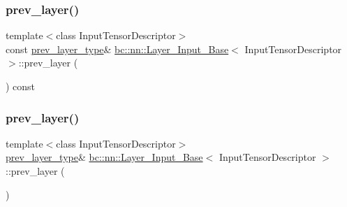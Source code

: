 \mbox{\label{classbc_1_1nn_1_1Layer__Input__Base_a30fe05002f852c298572f41da7486670}} 
\subsubsection{\texorpdfstring{prev\+\_\+layer()}{prev\_layer()}\hspace{0.1cm}{\footnotesize\ttfamily [3/4]}}
{\footnotesize\ttfamily template$<$class Input\+Tensor\+Descriptor$>$ \\
const \hyperlink{structbc_1_1nn_1_1Layer__Output__Base}{prev\+\_\+layer\+\_\+type}\& \hyperlink{classbc_1_1nn_1_1Layer__Input__Base}{bc\+::nn\+::\+Layer\+\_\+\+Input\+\_\+\+Base}$<$ Input\+Tensor\+Descriptor $>$\+::prev\+\_\+layer (\begin{DoxyParamCaption}{ }\end{DoxyParamCaption}) const\hspace{0.3cm}{\ttfamily [inline]}}

\mbox{\label{classbc_1_1nn_1_1Layer__Input__Base_aa46a9668548a06e6538f485a0200edbc}} 
\subsubsection{\texorpdfstring{prev\+\_\+layer()}{prev\_layer()}\hspace{0.1cm}{\footnotesize\ttfamily [4/4]}}
{\footnotesize\ttfamily template$<$class Input\+Tensor\+Descriptor$>$ \\
\hyperlink{structbc_1_1nn_1_1Layer__Output__Base}{prev\+\_\+layer\+\_\+type}\& \hyperlink{classbc_1_1nn_1_1Layer__Input__Base}{bc\+::nn\+::\+Layer\+\_\+\+Input\+\_\+\+Base}$<$ Input\+Tensor\+Descriptor $>$\+::prev\+\_\+layer (\begin{DoxyParamCaption}{ }\end{DoxyParamCaption})\hspace{0.3cm}{\ttfamily [inline]}}

